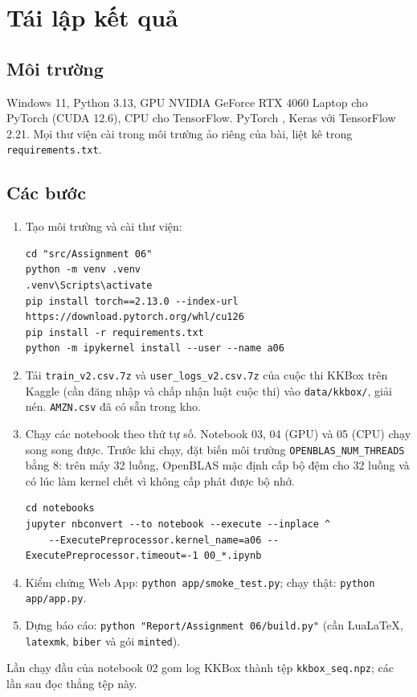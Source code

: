 \chapter{Tái lập kết quả}
\label{ch:phuluc}

\section{Môi trường}

Windows 11, Python 3.13, GPU NVIDIA GeForce RTX 4060 Laptop cho PyTorch (CUDA 12.6), CPU cho TensorFlow. PyTorch
, Keras  với TensorFlow 2.21. Mọi thư viện cài trong môi trường ảo riêng
của bài, liệt kê trong \texttt{requirements.txt}.

\section{Các bước}

\begin{enumerate}
  \item Tạo môi trường và cài thư viện:
\begin{verbatim}
cd "src/Assignment 06"
python -m venv .venv
.venv\Scripts\activate
pip install torch==2.13.0 --index-url https://download.pytorch.org/whl/cu126
pip install -r requirements.txt
python -m ipykernel install --user --name a06
\end{verbatim}
  \item Tải \texttt{train\_v2.csv.7z} và \texttt{user\_logs\_v2.csv.7z} của cuộc thi KKBox trên Kaggle (cần đăng nhập và
        chấp nhận luật cuộc thi) vào \texttt{data/kkbox/}, giải nén. \texttt{AMZN.csv} đã có sẵn trong kho.
  \item Chạy các notebook theo thứ tự số. Notebook 03, 04 (GPU) và 05 (CPU) chạy song song được. Trước khi chạy, đặt
        biến môi trường \texttt{OPENBLAS\_NUM\_THREADS} bằng 8: trên máy 32 luồng, OpenBLAS mặc định cấp bộ đệm cho 32
        luồng và có lúc làm kernel chết vì không cấp phát được bộ nhớ.
\begin{verbatim}
cd notebooks
jupyter nbconvert --to notebook --execute --inplace ^
    --ExecutePreprocessor.kernel_name=a06 --ExecutePreprocessor.timeout=-1 00_*.ipynb
\end{verbatim}
  \item Kiểm chứng Web App: \texttt{python app/smoke\_test.py}; chạy thật: \texttt{python app/app.py}.
  \item Dựng báo cáo: \texttt{python "Report/Assignment 06/build.py"} (cần LuaLaTeX, \texttt{latexmk}, \texttt{biber}
        và gói \texttt{minted}).
\end{enumerate}

Lần chạy đầu của notebook 02 gom log KKBox thành tệp \texttt{kkbox\_seq.npz}; các lần sau đọc thẳng tệp này.

